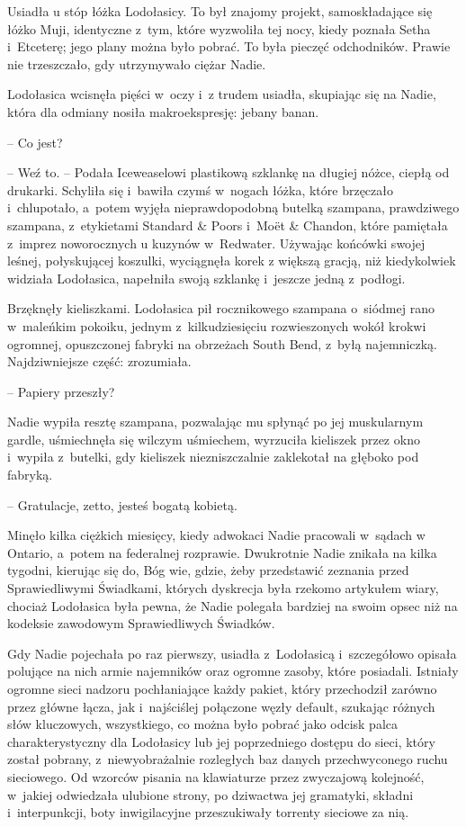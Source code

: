 \documentclass[oneside,polish,11pt,sfheadings]{mwbk}
\begin{document}
Usiadła u stóp łóżka Lodołasicy. To był znajomy
projekt, samoskładające się łóżko Muji, identyczne z~tym, które
wyzwoliła tej nocy, kiedy poznała Setha i~Etceterę; jego plany można
było pobrać. To była pieczęć odchodników. Prawie nie trzeszczało, gdy
utrzymywało ciężar Nadie.

Lodołasica wcisnęła pięści w~oczy i~z trudem usiadła, skupiając się na
Nadie, która dla odmiany nosiła makroekspresję: jebany banan.

-- Co jest?

-- Weź to. -- Podała Iceweaselowi plastikową szklankę na długiej nóżce,
ciepłą od drukarki. Schyliła się i~bawiła czymś w~nogach łóżka, które
brzęczało i~chlupotało, a~potem wyjęła nieprawdopodobną butelką
szampana, prawdziwego szampana, z~etykietami Standard \& Poors i~Moët \&
Chandon, które pamiętała z~imprez noworocznych u kuzynów w~Redwater.
Używając końcówki swojej leśnej, połyskującej koszulki, wyciągnęła korek
z większą gracją, niż kiedykolwiek widziała Lodołasica, napełniła swoją
szklankę i~jeszcze jedną z~podłogi.

Brzęknęły kieliszkami. Lodołasica pił rocznikowego szampana o~siódmej
rano w~maleńkim pokoiku, jednym z~kilkudziesięciu rozwieszonych wokół
krokwi ogromnej, opuszczonej fabryki na obrzeżach South Bend, z~byłą
najemniczką. Najdziwniejsze część: zrozumiała.

-- Papiery przeszły?

Nadie wypiła resztę szampana, pozwalając mu spłynąć po jej muskularnym
gardle, uśmiechnęła się wilczym uśmiechem, wyrzuciła kieliszek przez
okno i~wypiła z~butelki, gdy kieliszek niezniszczalnie zaklekotał na
głęboko pod fabryką.

-- Gratulacje, zetto, jesteś bogatą kobietą.

Minęło kilka ciężkich miesięcy, kiedy adwokaci Nadie pracowali w~sądach
w Ontario, a~potem na federalnej rozprawie. Dwukrotnie Nadie znikała na
kilka tygodni, kierując się do, Bóg wie, gdzie, żeby przedstawić
zeznania przed Sprawiedliwymi Świadkami, których dyskrecja była rzekomo
artykułem wiary, chociaż Lodołasica była pewna, że Nadie polegała
bardziej na swoim opsec niż na kodeksie zawodowym Sprawiedliwych
Świadków.

Gdy Nadie pojechała po raz pierwszy, usiadła z~Lodołasicą i~szczegółowo
opisała polujące na nich armie najemników oraz ogromne zasoby, które
posiadali. Istniały ogromne sieci nadzoru pochłaniające każdy pakiet,
który przechodził zarówno przez główne łącza, jak i~najściślej połączone
węzły default, szukając różnych słów kluczowych, wszystkiego, co można
było pobrać jako odcisk palca charakterystyczny dla Lodołasicy lub jej
poprzedniego dostępu do sieci, który został pobrany, z~niewyobrażalnie
rozległych baz danych przechwyconego ruchu sieciowego. Od wzorców
pisania na klawiaturze przez zwyczajową kolejność, w~jakiej odwiedzała
ulubione strony, po dziwactwa jej gramatyki, składni i~interpunkcji,
boty inwigilacyjne przeszukiwały torrenty sieciowe za nią.
\end{document}
